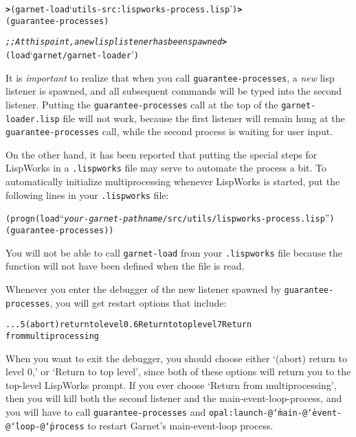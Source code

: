 \documentclass{report}
\newenvironment{programexample}{\begin{alltt}}{\end{alltt}}
\begin{document}
\begin{programexample}
  {\bf >} (garnet-load `utils-src:lispworks-process.lisp') {\bf >}
  (guarantee-processes)
  
  {\it ;; At this point, a new lisp listener has been spawned} {\bf >}
  (load `garnet/garnet-loader')
\end{programexample}

It is {\it important} to realize that when you call
\texttt{guarantee-processes}, a {\it new} lisp listener is spawned, and
all subsequent commands will be typed into the second listener.
Putting the \texttt{guarantee-processes} call at the top of the
\texttt{garnet-loader.lisp} file will not work, because the first listener
will remain hung at the \texttt{guarantee-processes} call, while the
second process is waiting for user input.

On the other hand, it has been reported that putting the special steps
for LispWorks in a \texttt{.lispworks} file may serve to automate the
process a bit.  To automatically initialize multiprocessing whenever
LispWorks is started, put the following lines in your \texttt{.lispworks}
file:
\begin{programexample}
  (progn (load ``\textit{your-garnet-pathname}/src/utils/lispworks-process.lisp'')
  (guarantee-processes))
\end{programexample}
You will not be able to call \texttt{garnet-load} from your
\texttt{.lispworks} file because the function will not have been defined
when the file is read.

Whenever you enter the debugger of the new listener spawned by
\texttt{guarantee-processes}, you will get restart options that include:

\begin{programexample}
  ...  5 (abort) return to level 0.  6 Return to top level 7 Return
  from multiprocessing
\end{programexample}

When you want to exit the debugger, you should choose either `(abort)
return to level 0,' or `Return to top level', since both of these
options will return you to the top-level LispWorks prompt.  If you
ever choose `Return from multiprocessing', then you will kill both the
second listener and the main-event-loop-process, and you will have to
call \texttt{guarantee-processes} and
\texttt{opal:launch-@{\tt\char`\|}main-@{\tt\char`\|}event-@{\tt\char`\|}loop-@{\tt\char`\|}process}
to restart Garnet's main-event-loop process.
\end{document}
